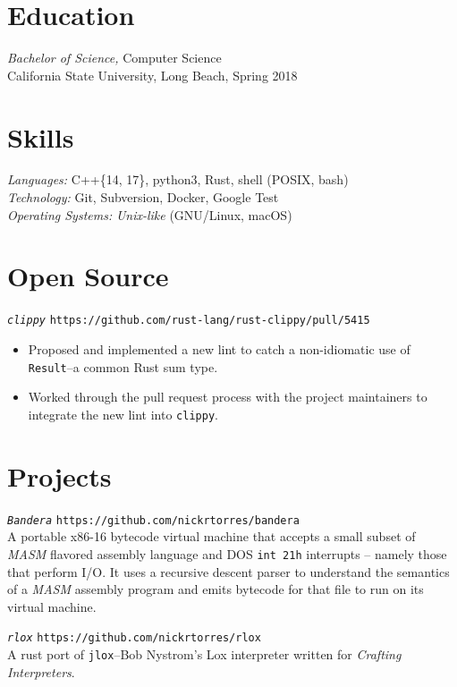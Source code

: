 \documentclass[margin]{res}
\begin{document}
\begin{resume}
\section{Education}
                    {\sl Bachelor of Science,} Computer Science \\
                    California State University, Long Beach, Spring 2018

\section{Skills}
                    {\sl Languages:} C++\{14, 17\}, python3, Rust, shell (POSIX, bash) \\
                    {\sl Technology:} Git, Subversion, Docker, Google Test  \\
                    {\sl Operating Systems:} \textit{Unix-like} (GNU/Linux, macOS) \\

\section{Open Source}
              {\sl \texttt{clippy}} \hfill \texttt{https://github.com/rust-lang/rust-clippy/pull/5415}
                 \begin{itemize}
                   \item Proposed and implemented a new lint to catch a non-idiomatic use of
                   \texttt{Result}--a common Rust sum type.
                   \item Worked through the pull request process with the
                   project maintainers to integrate the new lint into
                   \texttt{clippy}.
                 \end{itemize}

\section{Projects}
             {\sl \texttt{Bandera}} \hfill \texttt{https://github.com/nickrtorres/bandera} \\
             A portable x86-16 bytecode virtual machine that accepts a small
             subset of \textit{MASM} flavored assembly language and DOS
             \texttt{int 21h} interrupts -- namely those that perform I/O. It
             uses a recursive descent parser to understand the semantics of a
             \textit{MASM} assembly program and emits bytecode for that file to
             run on its virtual machine.

             {\sl \texttt{rlox}} \hfill \texttt{https://github.com/nickrtorres/rlox} \\
             A rust port of \texttt{jlox}--Bob Nystrom's Lox interpreter
             written for {\sl Crafting Interpreters}.

\end{resume}
\end{document}
